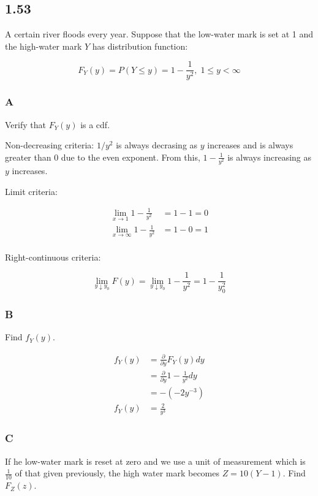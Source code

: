 \subsection*{1.53}

A certain river floods every year. Suppose that the low-water mark is set at 1 and the high-water mark $Y$ has distribution function:

\[
	F_Y(y) = P(Y \leq y) = 1 - \frac{1}{y^2}, \; 1 \leq y < \infty
\]

\subsubsection*{A}

Verify that $F_Y(y)$ is a cdf.

Non-decreasing criteria: $1/y^2$ is always decrasing as $y$ increases and is always greater than 0 due to the even exponent. From this, $1 - \frac{1}{y^2}$ is always increasing as $y$ increases. 

Limit criteria:

\begin{align*}
	\lim_{x\to1} 1 - \frac{1}{y^2} &= 1 - 1 = 0 \\
	\lim_{x\to \infty} 1 - \frac{1}{y^2} &= 1 - 0 = 1 \\
\end{align*}

Right-continuous criteria:

\[\lim_{y \downarrow y_0} F(y) = \lim_{y \downarrow y_0} 1 - \frac{1}{y^2} = 1 - \frac{1}{y_0^2}\]

\subsubsection*{B}

Find $f_Y(y)$. 

\begin{align*}
	f_Y(y) &= \frac{\partial}{\partial y} F_Y(y) dy \\
	&= \frac{\partial}{\partial y} 1 - \frac{1}{y^2} dy \\
	&= - (-2y^{-3}) \\
	f_Y(y) &= \frac{2}{y^3}
\end{align*}

\subsubsection*{C}

If he low-water mark is reset at zero and we use a unit of measurement which is $\frac{1}{10}$ of that given previously, the high water mark becomes $Z=10(Y - 1)$. Find $F_Z(z)$.

